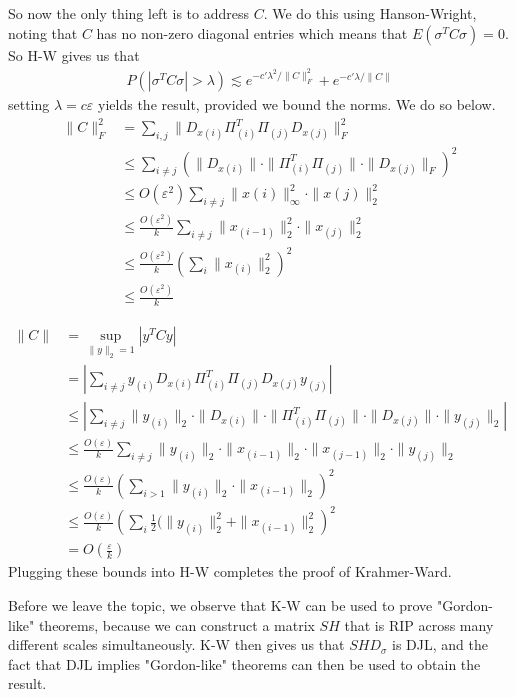 \documentclass[11pt]{article}
\newcommand{\ep}{\varepsilon}
\begin{document}
So now the only thing left is to address $C$. We do this using Hanson-Wright, noting that $C$ has no non-zero diagonal entries which means that $E(\sigma^T C \sigma) = 0$. So H-W gives us that
\begin{align*}
P(|\sigma^T C \sigma| > \lambda) \lesssim e^{-c' \lambda^2 / \|C\|_F^2} + e^{-c'\lambda/\|C\|}
\end{align*}
setting $\lambda = c\ep$ yields the result, provided we bound the norms. We do so below.
\begin{align*}
\|C\|_F^2 &= \sum_{i,j} \| D_{x(i)} \Pi_{(i)}^T \Pi_{(j)} D_{x(j)} \|_F^2 \\
	&\leq \sum_{i\neq j} \left(\| D_{x(i)} \| \cdot \|\Pi_{(i)}^T \Pi_{(j)}\| \cdot \| D_{x(j)}\|_F\right)^2 \tag{$\|AB\|_F \leq \|A\| \cdot \|B\|_F$} \\
	&\leq O(\ep^2) \sum_{i\neq j} \| x(i) \|_\infty^2 \cdot \| x(j)\|_2^2 \tag{RIP since $i \neq j$, and $D$ matrices are diagonal} \\
	&\leq \frac{O(\ep^2)}{k} \sum_{i \neq j} \| x_{(i-1)} \|_2^2 \cdot \| x_{(j)}\|_2^2 \tag{shelling + norm inequalities} \\
	&\leq \frac{O(\ep^2)}{k} \left( \sum_i \|x_{(i)}\|_2^2 \right)^2 \tag{monomials a superset of the terms in previous line} \\
	&\leq \frac{O(\ep^2)}{k}
\end{align*}

\begin{align*}
\|C\| &= \sup_{\|y\|_2 = 1} |y^T C y| \\
	&= \left| \sum_{i \neq j} y_{(i)} D_{x(i)} \Pi_{(i)}^T \Pi_{(j)} D_{x(j)} y_{(j)} \right| \\
	&\leq \left| \sum_{i \neq j} \| y_{(i)} \|_2 \cdot \|D_{x(i)}\| \cdot \| \Pi_{(i)}^T \Pi_{(j)}\| \cdot \| D_{x(j)} \| \cdot \|y_{(j)}\|_2 \right| \\
	&\leq \frac{O(\ep)}{k} \sum_{i \neq j} \|y_{(i)}\|_2 \cdot \|x_{(i-1)}\|_2 \cdot \|x_{(j-1)}\|_2 \cdot \|y_{(j)}\|_2 \tag{shelling twice}\\
	&\leq \frac{O(\ep)}{k} \left( \sum_{i>1} \| y_{(i)}\|_2 \cdot \|x_{(i-1)}\|_2 \right)^2 \\
	&\leq \frac{O(\ep)}{k} \left( \sum_i \frac{1}{2}(\|y_{(i)}\|_2^2 + \|x_{(i-1)}\|_2^2 \right)^2 \tag{AM-GM} \\
	&= O\left(\frac{\ep}{k} \right)
\end{align*}
Plugging these bounds into H-W completes the proof of Krahmer-Ward.

Before we leave the topic, we observe that K-W can be used to prove "Gordon-like" theorems, because we can construct a matrix $SH$ that is RIP across many different scales simultaneously. K-W then gives us that $SHD_\sigma$ is DJL, and the fact that DJL implies "Gordon-like" theorems can then be used to obtain the result.
\end{document}
